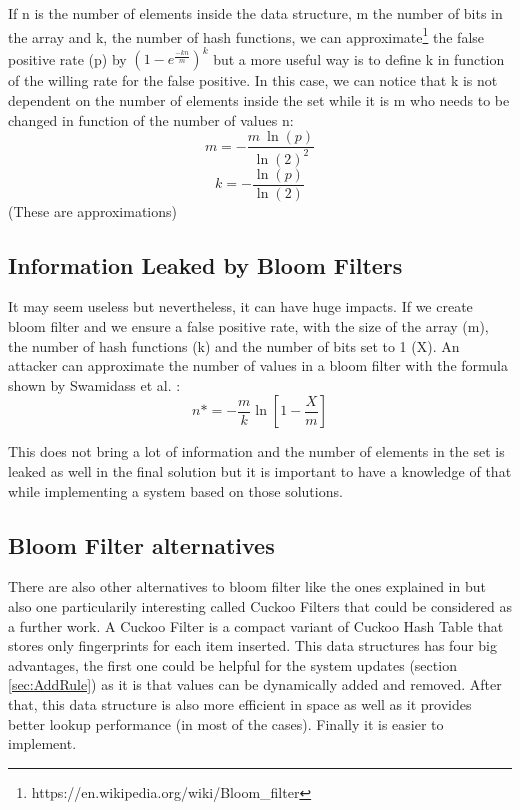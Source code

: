 \documentclass{eplmastersthesis}
\begin{document}
If n is the number of elements inside the data structure, m the number of bits in the array and k, the number of hash functions, we can approximate\footnote{https://en.wikipedia.org/wiki/Bloom\_filter} the false positive rate (p) by $(1-e^{\frac{-kn}{m}})^k$ but a more useful way is to define k in function of the willing rate for the false positive. In this case, we can notice that k is not dependent on the number of elements inside the set while it is m who needs to be changed in function of the number of values n:
$$m = - \frac{m\ \ln(p)}{\ln(2)^2}$$
$$k = - \frac{\ln(p)}{\ln(2)}$$
(These are approximations)

\subsection{Information Leaked by Bloom Filters}
It may seem useless but nevertheless, it can have huge impacts. If we create bloom filter and we ensure a false positive rate, with the size of the array (m), the number of hash functions (k) and the number of bits set to 1 (X). An attacker can approximate the number of values in a bloom filter with the formula shown by Swamidass et al. \cite{swamidass2007mathematical}:
$$n* = - \frac{m}{k} \ln\left[1 - \frac{X}{m}\right] $$

This does not bring a lot of information and the number of elements in the set is leaked as well in the final solution but it is important to have a knowledge of that while implementing a system based on those solutions.

\subsection{Bloom Filter alternatives}
\label{sec:BFAlternatives}
There are also other alternatives to bloom filter like the ones explained in \cite{putze2007cache} but also one particularily interesting called Cuckoo Filters \cite{fan2014cuckoo} that could be considered as a further work.
A Cuckoo Filter is a compact variant of Cuckoo Hash Table \cite{pagh2001cuckoo} that stores only fingerprints for each item inserted. This data structures has four big advantages, the first one could be helpful for the system updates (section \ref{sec:AddRule}) as it is that values can be dynamically added and removed. After that, this data structure is also more efficient in space as well as it provides better lookup performance (in most of the cases). Finally it is easier to implement.
\end{document}
